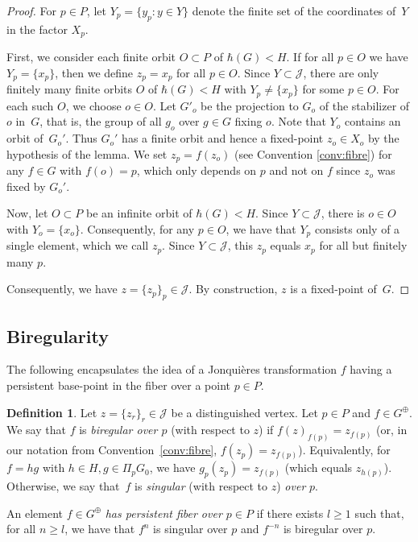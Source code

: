 \documentclass[11pt]{article}
\numberwithin{equation}{section}
\newcommand{\Jon}{\mathscr{J}}
\theoremstyle{plain}
\theoremstyle{definition}
\newtheorem{definition}[theorem]{Definition}
\begin{document}
\begin{proof}
{
For $p\in P$, let $Y_p=\{y_p \colon y\in Y\}$ denote the finite set of the coordinates of~$Y$ in the factor $X_p$.}

{First, we consider each finite orbit $O\subset P$ of $\hbar(G)<H$. If for all $p\in O$ we have $Y_p=\{x_p\}$, then we define $z_p=x_p$ for all $p\in O$.
Since $Y\subset \Jon$, there are only finitely many finite orbits $O$ of $\hbar(G)<H$ with $Y_p\neq \{x_p\}$ for some $p\in O$. For each such $O$, we choose $o\in O$. Let $G'_o$ be the projection to $G_o$ of the stabilizer of $o$ in~$G$, that is, the group of all $g_o$ over $g\in G$ fixing $o$. Note that $Y_o$ contains an orbit of~$G_o'$. Thus $G_o'$ has a finite orbit and hence a fixed-point $z_o\in X_o$ by the hypothesis of the lemma. We set $z_p=f(z_o)$ (see Convention \ref{conv:fibre}) for any $f\in G$ with $f(o)=p$, which only depends on $p$ and not on $f$ since $z_o$ was fixed by $G_o'$. }

{Now, let $O\subset P$ be an infinite orbit of $\hbar(G)<H$. Since $Y\subset \Jon$, there is $o\in O$ with $Y_o=\{x_o\}$. Consequently, for any $p\in O$, we have that $Y_p$ consists only of a single element, which we call $z_p$.
Since $Y\subset \Jon$, this $z_p$ equals $x_p$ for all but finitely many $p$.}

{Consequently, we have $z=\{z_p\}_p\in \Jon$. By construction, $z$ is a fixed-point of~$G$.}
\end{proof}

\subsection{Biregularity}

The following encapsulates the idea of a Jonquières transformation $f$ having a persistent base-point in the fiber over a point $p\in P$.

\begin{definition}
\label{def:pers} Let $z=\{z_r\}_r\in \Jon$ be a distinguished vertex. Let $p\in P$ and $f\in G^\oplus$. We say that $f$ is \emph{biregular over $p$} (with respect to $z$) if $f(z)_{f(p)}=z_{f(p)}$ (or, in our notation from Convention~\ref{conv:fibre}, $f(z_p)=z_{f(p)}$). Equivalently, for $f=hg$ with $h\in H, g\in \Pi_pG_0$, we have $g_p(z_p)=z_{f(p)}$ (which equals $z_{h(p)}$). Otherwise, we say that~$f$ is \emph{singular} (with respect to $z$) \emph{over} $p$.

An element $f\in G^\oplus$ \emph{has persistent fiber over $p\in P$} if there exists $l\geq 1$ such that, for all $n\geq l$, we have that $f^n$ is singular over $p$ and $f^{-n}$ is biregular over $p$.
\end{definition}
\end{document}
